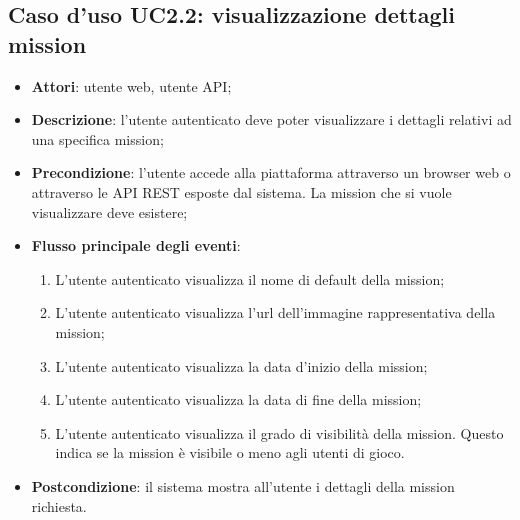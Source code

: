 \subsection{Caso d'uso UC2.2: visualizzazione dettagli mission}
\begin{itemize}
\item \textbf{Attori}: utente web, utente API;
\item \textbf{Descrizione}: l'utente autenticato deve poter visualizzare i dettagli relativi ad una specifica mission; 
      \item \textbf{Precondizione}: l'utente accede alla piattaforma attraverso un browser web o attraverso le API REST esposte dal sistema. La mission che si vuole visualizzare deve esistere;

        \item \textbf{Flusso principale degli eventi}:
          \begin{enumerate}
          \item L'utente autenticato visualizza il nome di default della mission;
          \item L'utente autenticato visualizza l'\gls{url}\glsfirstoccur{} dell'immagine rappresentativa della mission;
          \item L'utente autenticato visualizza la data d'inizio della mission;
          \item L'utente autenticato visualizza la data di fine della mission;
          \item L'utente autenticato visualizza il grado di visibilità della mission. Questo indica se la mission è visibile o meno agli utenti di gioco.

      \end{enumerate}
    \item \textbf{Postcondizione}: il sistema mostra all'utente i dettagli della mission richiesta.
  \end{itemize}
\hypertarget{UC2.3}{}
